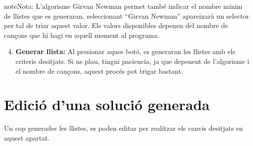 \documentclass[a4paper,10pt,oneside]{sphinxmanual}
\begin{document}
\begin{notice}{note}{Nota:}
L'algorisme Girvan Newman permet també indicar el nombre minim de llistes que es generaran, seleccionant ``Girvan Newman'' apareixarà un selector per tal de triar aquest valor. Els valors disponibles depenen del nombre de cançons que hi hagi en aquell moment al programa.
\end{notice}
\begin{enumerate}
\setcounter{enumi}{3}
\item {} 
\textbf{Generar llista:} Al presionar aques botó, es generaran les llistes amb els criteris desitjats. Si us plau, tingui paciencia, ja que depenent de l'algorisme i el nombre de cançons, aquest procés pot trigar bastant.

\end{enumerate}


\section{Edició d'una solució generada}
\label{gen_llistes:edicio-d-una-solucio-generada}
Un cop generades les llistes, es poden editar per realitzar els canvis desitjats en aquest apartat.
\end{document}
